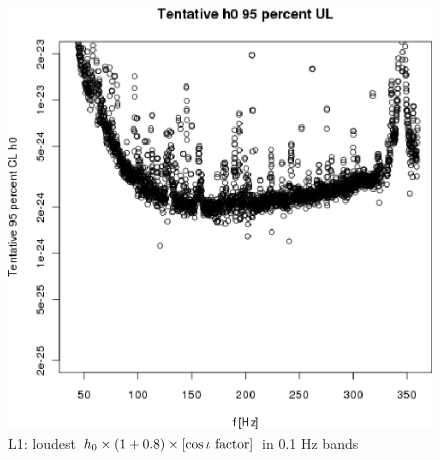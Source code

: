 \begin{figure}
\begin{center}
\includegraphics[width=0.5\paperwidth,height=0.35\paperheight]{plots/h0FullUL95logGuess-L1.eps}
\caption{
L1: loudest $h_0 \times \left( 1 + 0.8 \right) \times \left[\cos \iota \textup{ factor}\right]$ in 0.1 Hz bands}
\end{center}
\end{figure}

